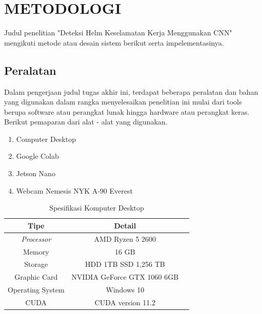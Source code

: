\chapter{METODOLOGI}
\label{chap:metodologi}


Judul penelitian "Deteksi Helm Keselamatan Kerja Menggunakan CNN" mengikuti metode atau desain sistem berikut serta impelementasinya.


\section{Peralatan}
\label{sec:peralatan}

Dalam pengerjaan judul tugas akhir ini, terdapat beberapa peralatan dan bahan yang digunakan dalam rangka menyelesaikan penelitian ini mulai dari tools berupa software atau perangkat lunak hingga hardware atau perangkat keras. Berikut pemaparan dari alat - alat yang digunakan.

\begin{enumerate}[nolistsep]
  \item Computer Desktop 
  \item Google Colab
  \item Jetson Nano
  \item Webcam Nemesis NYK A-90 Everest
\end{enumerate}


\begin{longtable}{|c|c|c|}
  \caption{Spesifikasi Komputer Desktop}
  \label{tb:spesifikasikomputer}\\
  \hline
  \textbf{Tipe} & \textbf{Detail}  \\
  \hline
  \textit{Processor} & AMD Ryzen 5 2600 \\ 
  Memory             & 16 GB  \\
  Storage            & HDD 1TB SSD 1,256 TB\\
  Graphic Card       & NVIDIA GeForce GTX 1060 6GB \\
  Operating System   & Windows 10     \\
  CUDA               & CUDA version 11.2    \\              
  \hline
\end{longtable}

